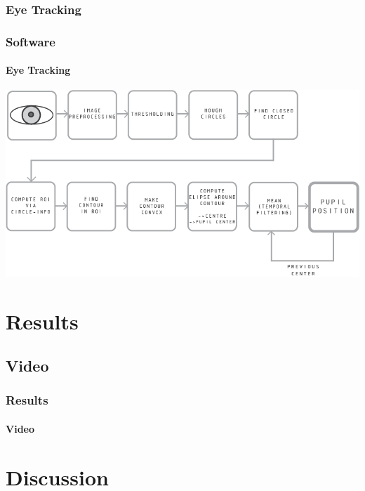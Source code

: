 \documentclass[%
14pt
]{beamer}
\begin{document}
\subsubsection{Eye Tracking}
\begin{frame}
	\frametitle{Software}
  \framesubtitle{Eye Tracking}
  \vspace*{-0.5cm}
  \begin{center}
    \includegraphics[width=1.05\textwidth]{02.png}
  \end{center}
\end{frame}


\section{Results}
\subsection{Video}
\begin{frame}
	\frametitle{Results}
  \framesubtitle{Video}
\end{frame}

\section{Discussion}
\end{document}
